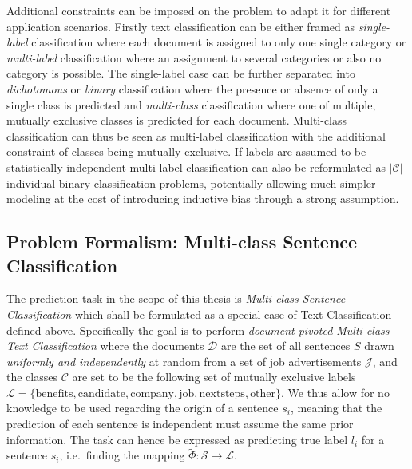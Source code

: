 Additional constraints can be imposed on the problem to adapt it for different application scenarios. Firstly text classification can be either framed as \emph{single-label} classification where each document is assigned to only one single category or \emph{multi-label} classification where an assignment to several categories or also no category is possible. The single-label case can be further separated into \emph{dichotomous} or \emph{binary} classification where the presence or absence of only a single class is predicted and \emph{multi-class} classification where one of multiple, mutually exclusive classes is predicted for each document.
Multi-class classification can thus be seen as multi-label classification with the additional constraint of classes being mutually exclusive.
If labels are assumed to be statistically independent multi-label classification can also be reformulated as $|\mathcal{C}|$ individual binary classification problems, potentially allowing much simpler modeling at the cost of introducing inductive bias through a strong assumption.


\subsection{Problem Formalism: Multi-class Sentence Classification}
\label{subs:Problem Formalism: Multi-class Sentence Classification}

The prediction task in the scope of this thesis is \emph{Multi-class Sentence Classification} which shall be formulated as a special case of Text Classification defined above. Specifically the goal is to perform \emph{document-pivoted Multi-class Text Classification} where the documents $\mathcal{D}$ are the set of all sentences $S$ drawn \emph{uniformly and independently} at random from a set of job advertisements $\mathcal{J}$, and the classes $\mathcal{C}$ are set to be the following set of mutually exclusive labels $\mathcal{L} = \{ \text{benefits}, \text{candidate}, \text{company}, \text{job}, \text{nextsteps}, \text{other} \}$. We thus allow for no knowledge to be used regarding the origin of a sentence $s_i$, meaning that the prediction of each sentence is independent must assume the same prior information. The task can hence be expressed as predicting true label $l_i$ for a sentence $s_i$, i.e.\ finding the mapping $\widetilde{\Phi} : \mathcal{S} \rightarrow \mathcal{L}$.

